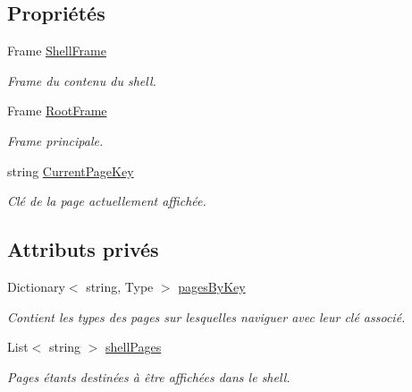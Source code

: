 \subsection*{Propriétés}
\begin{DoxyCompactItemize}
\item 
Frame \hyperlink{class_boxes_1_1_services_1_1_navigation_1_1_navigation_service_ab894fb70e405311074f5e0122fece0ff}{Shell\+Frame}
\begin{DoxyCompactList}\small\item\em Frame du contenu du shell. \end{DoxyCompactList}\item 
Frame \hyperlink{class_boxes_1_1_services_1_1_navigation_1_1_navigation_service_a6735d62868cecd7fdb84b66bb7995abf}{Root\+Frame}
\begin{DoxyCompactList}\small\item\em Frame principale. \end{DoxyCompactList}\item 
string \hyperlink{class_boxes_1_1_services_1_1_navigation_1_1_navigation_service_ab080fe0a7b5e990934e11b55a03bbf28}{Current\+Page\+Key}
\begin{DoxyCompactList}\small\item\em Clé de la page actuellement affichée. \end{DoxyCompactList}\end{DoxyCompactItemize}
\subsection*{Attributs privés}
\begin{DoxyCompactItemize}
\item 
Dictionary$<$ string, Type $>$ \hyperlink{class_boxes_1_1_services_1_1_navigation_1_1_navigation_service_ab47e2610acc4784083f0fc7706653b18}{pages\+By\+Key}
\begin{DoxyCompactList}\small\item\em Contient les types des pages sur lesquelles naviguer avec leur clé associé. \end{DoxyCompactList}\item 
List$<$ string $>$ \hyperlink{class_boxes_1_1_services_1_1_navigation_1_1_navigation_service_af210b37736b21117084b53510c225b89}{shell\+Pages}
\begin{DoxyCompactList}\small\item\em Pages étants destinées à être affichées dans le shell. \end{DoxyCompactList}\end{DoxyCompactItemize}



